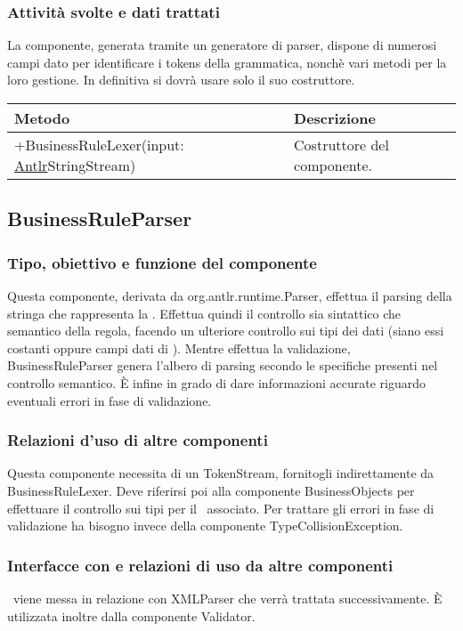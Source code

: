 \subsubsection{Attivit\`a svolte e dati trattati}
La componente, generata tramite un generatore di parser, dispone di numerosi campi dato per identificare i tokens della grammatica, nonch\`e vari metodi per la loro gestione. In definitiva si dovr\`a usare solo il suo costruttore.
\begin{center}
\begin{tabular}{||p{6cm}||p{6cm}||} \hline
Metodo & Descrizione \\  \hline
+BusinessRuleLexer(input: \underline{Antlr}StringStream) &   Costruttore del componente.\\ \hline
\end{tabular}
\end{center}

\subsection{BusinessRuleParser}
\subsubsection{Tipo, obiettivo e funzione del componente}
Questa componente, derivata da org.antlr.runtime.Parser, effettua il parsing della stringa che rappresenta la \br. Effettua quindi il controllo sia sintattico che semantico della regola, facendo un ulteriore controllo sui tipi dei dati (siano essi costanti oppure campi dati di \bos). Mentre effettua la validazione, BusinessRuleParser genera l'albero di parsing secondo le specifiche presenti nel controllo semantico. \`E infine in grado di dare informazioni accurate riguardo eventuali errori in fase di validazione.
\subsubsection{Relazioni d'uso di altre componenti}
Questa componente necessita di un TokenStream, fornitogli indirettamente da BusinessRuleLexer. Deve riferirsi poi alla componente BusinessObjects per effettuare il controllo sui tipi per il \bo\ associato. Per trattare gli errori in fase di validazione ha bisogno invece della componente TypeCollisionException.
\subsubsection{Interfacce con e relazioni di uso da altre componenti}
\brp\ viene messa in relazione con XMLParser che verr\`a trattata successivamente.
\`E utilizzata inoltre dalla componente Validator.
